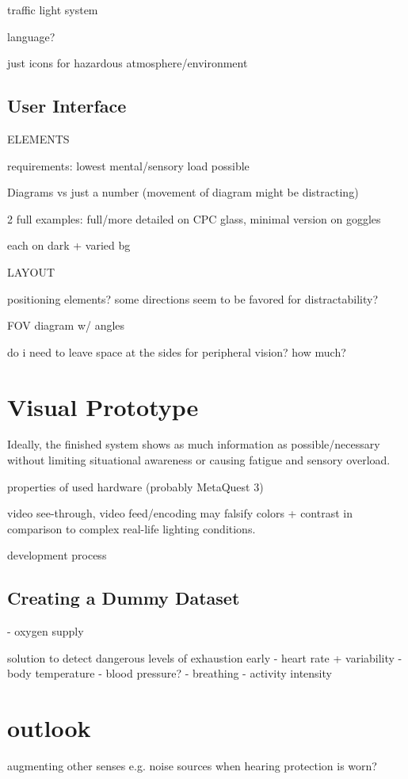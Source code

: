 traffic light system

language?

just icons for hazardous atmosphere/environment

\subsection{User Interface}

ELEMENTS

requirements: lowest mental/sensory load possible

Diagrams vs just a number (movement of diagram might be distracting)

2 full examples: full/more detailed on CPC glass, minimal version on goggles

each on dark + varied bg

LAYOUT

positioning elements? some directions seem to be favored for distractability?

FOV diagram w/ angles

do i need to leave space at the sides for peripheral vision? how much?


\section{Visual Prototype}

Ideally, the finished system shows as much information as possible/necessary without limiting situational awareness or causing fatigue and sensory overload.

properties of used hardware (probably MetaQuest 3)

video see-through, video feed/encoding may falsify colors + contrast in comparison to complex real-life lighting conditions.

development process

\subsection{Creating a Dummy Dataset}

- oxygen supply

solution to detect dangerous levels of exhaustion early
- heart rate + variability
- body temperature
- blood pressure?
- breathing
- activity intensity




\section{outlook}

augmenting other senses e.g. noise sources when hearing protection is worn?
